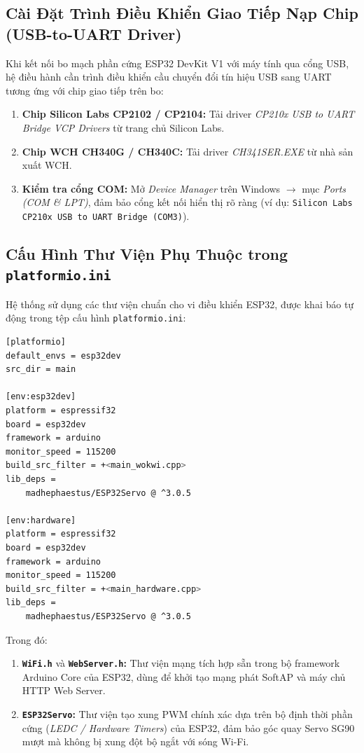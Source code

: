 \subsection{Cài Đặt Trình Điều Khiển Giao Tiếp Nạp Chip (USB-to-UART Driver)}
Khi kết nối bo mạch phần cứng ESP32 DevKit V1 với máy tính qua cổng USB, hệ điều hành cần trình điều khiển cầu chuyển đổi tín hiệu USB sang UART tương ứng với chip giao tiếp trên bo:
\begin{enumerate}
    \item \textbf{Chip Silicon Labs CP2102 / CP2104:} Tải driver \textit{CP210x USB to UART Bridge VCP Drivers} từ trang chủ Silicon Labs.
    \item \textbf{Chip WCH CH340G / CH340C:} Tải driver \textit{CH341SER.EXE} từ nhà sản xuất WCH.
    \item \textbf{Kiểm tra cổng COM:} Mở \textit{Device Manager} trên Windows $\rightarrow$ mục \textit{Ports (COM \& LPT)}, đảm bảo cổng kết nối hiển thị rõ ràng (ví dụ: \texttt{Silicon Labs CP210x USB to UART Bridge (COM3)}).
\end{enumerate}

\subsection{Cấu Hình Thư Viện Phụ Thuộc trong \texttt{platformio.ini}}
Hệ thống sử dụng các thư viện chuẩn cho vi điều khiển ESP32, được khai báo tự động trong tệp cấu hình \texttt{platformio.ini}:

\begin{lstlisting}[language=bash, caption={Cấu hình môi trường biên dịch trong tệp platformio.ini}]
[platformio]
default_envs = esp32dev
src_dir = main

[env:esp32dev]
platform = espressif32
board = esp32dev
framework = arduino
monitor_speed = 115200
build_src_filter = +<main_wokwi.cpp>
lib_deps =
    madhephaestus/ESP32Servo @ ^3.0.5

[env:hardware]
platform = espressif32
board = esp32dev
framework = arduino
monitor_speed = 115200
build_src_filter = +<main_hardware.cpp>
lib_deps =
    madhephaestus/ESP32Servo @ ^3.0.5
\end{lstlisting}

Trong đó:
\begin{enumerate}
    \item \textbf{\texttt{WiFi.h}} và \textbf{\texttt{WebServer.h}:} Thư viện mạng tích hợp sẵn trong bộ framework Arduino Core của ESP32, dùng để khởi tạo mạng phát SoftAP và máy chủ HTTP Web Server.
    \item \textbf{\texttt{ESP32Servo}:} Thư viện tạo xung PWM chính xác dựa trên bộ định thời phần cứng (\textit{LEDC / Hardware Timers}) của ESP32, đảm bảo góc quay Servo SG90 mượt mà không bị xung đột bộ ngắt với sóng Wi-Fi.
\end{enumerate}

